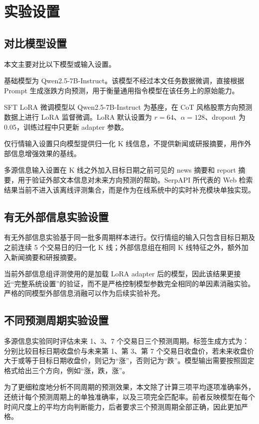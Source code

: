 \section{实验设置}

\subsection{对比模型设置}

本文主要对比以下模型或输入设置。

基础模型为 Qwen2.5-7B-Instruct。该模型不经过本文任务数据微调，直接根据 Prompt 生成涨跌方向预测，用于衡量通用指令模型在该任务上的原始能力。

SFT LoRA 微调模型以 Qwen2.5-7B-Instruct 为基座，在 CoT 风格股票方向预测数据上进行 LoRA 监督微调。LoRA 默认设置为 \(r=64\)、\(\alpha=128\)、dropout 为 0.05，训练过程中只更新 adapter 参数。

仅行情输入设置只向模型提供归一化 K 线信息，不提供新闻或研报摘要，用作外部信息增强效果的基线。

多源信息输入设置在 K 线之外加入目标日期之前可见的 news 摘要和 report 摘要，用于验证外部文本信息对未来方向预测的帮助。SerpAPI 所代表的 Web 检索结果当前不进入该离线评测集合，而是作为在线系统中的实时补充模块单独实现。

\subsection{有无外部信息实验设置}

有无外部信息实验基于同一批多周期样本进行。仅行情组的输入只包含目标日期及之前连续 5 个交易日的归一化 K 线；外部信息组在相同 K 线特征之外，额外加入新闻摘要和研报摘要。

当前外部信息组评测使用的是加载 LoRA adapter 后的模型，因此该结果更接近“完整系统设置”的验证，而不是严格控制模型参数完全相同的单因素消融实验。严格的同模型外部信息消融可以作为后续实验补充。

\subsection{不同预测周期实验设置}

多源信息实验同时评估未来 1、3、7 个交易日三个预测周期。标签生成方式为：分别比较目标日期收盘价与未来第 1、第 3、第 7 个交易日收盘价，若未来收盘价大于或等于目标日期收盘价，则记为“涨”，否则记为“跌”。模型输出需要按照固定格式给出三个方向，例如“涨，跌，涨”。

为了更细粒度地分析不同周期的预测效果，本文除了计算三项平均逐项准确率外，还统计每个预测周期上的单独准确率，以及三项完全匹配率。前者反映模型在每个时间尺度上的平均方向判断能力，后者要求三个预测周期全部正确，因此更加严格。

